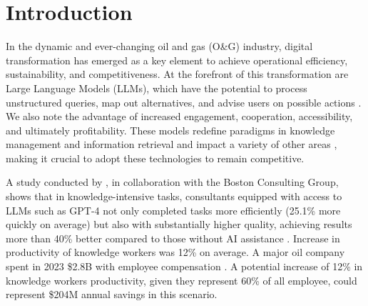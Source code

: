 
\chapter{Introduction}




    In the dynamic and ever-changing oil and gas (O\&G) industry,
    digital transformation has emerged as a key element to achieve operational efficiency, sustainability, and competitiveness. 
    At the forefront of this transformation are Large Language Models (LLMs), which have the potential to process unstructured queries, map out alternatives, and advise users on possible actions \citep{Kar2023}. 
    We also note the advantage of increased engagement, cooperation, accessibility, and ultimately profitability. 
    These models redefine paradigms in knowledge management and information retrieval and impact a variety of other areas \citep{Eckroth2023}, making it crucial to adopt these technologies to remain competitive.    
    
    A study conducted by \citet{Dellacqua2023}, in collaboration with the Boston Consulting Group, shows that in knowledge-intensive tasks, consultants equipped with access to LLMs such as GPT-4 not only completed tasks more efficiently (25.1\% more quickly on average) but also with substantially higher quality, achieving results more than 40\% better compared to those without AI assistance \citep{Dellacqua2023}.
    Increase in productivity of knowledge workers was 12\% on average.    
    A major oil company spent in 2023 \$2.8B with employee compensation \citep{Petrobras2024}.
    A potential increase of 12\% in knowledge workers productivity, given they represent 60\% of all employee, could represent \$204M annual savings in this scenario.     
    
